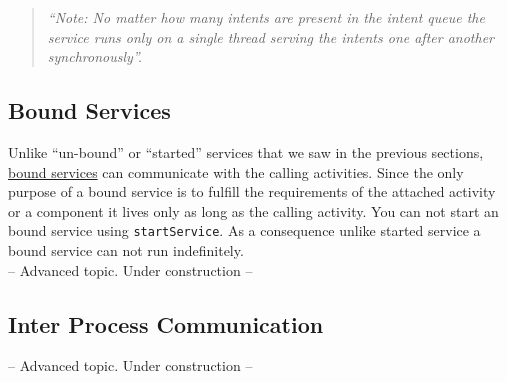 \begin{quote}
	\textit{``Note: No matter how many intents are present in the intent queue the service runs only on a single thread serving the intents one after another synchronously''.}
\end{quote}

\subsection{Bound Services}
\label{TAS:boundServices}
Unlike ``un-bound'' or ``started'' services that we saw in the previous sections, \href{https://developer.android.com/guide/components/bound-services.html}{bound services} can communicate with the calling activities. Since the only purpose of a bound service is to fulfill the requirements of the attached activity or a component it lives only as long as the calling activity. You can not start an bound service using \texttt{startService}. As a consequence unlike started service a bound service can not run indefinitely. \\

-- Advanced topic. Under construction --

\subsection{Inter Process Communication}

-- Advanced topic. Under construction --











